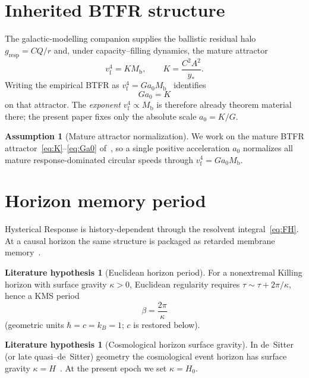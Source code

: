 \documentclass[11pt]{article}
\theoremstyle{definition}
\newtheorem{assumption}[theorem]{Assumption}
\newtheorem{literaturehypothesis}[theorem]{Literature hypothesis}
\theoremstyle{remark}
\newcommand{\Mb}{M_{\mathrm{b}}}
\newcommand{\vf}{v_{\mathrm{f}}}
\begin{document}
\section{Inherited BTFR structure}
\label{sec:btfr}
The galactic-modelling companion supplies the ballistic residual halo
$g_{\mathrm{resp}}=CQ/r$ and, under capacity--filling dynamics, the mature attractor~\cite{boyd2026galactic}
\begin{equation}
\label{eq:K}
\vf^{4}=K\Mb,\qquad K=\frac{C^{2}A^{2}}{y_{\ast}}.
\end{equation}
Writing the empirical BTFR as $\vf^{4}=Ga_0\Mb$~\cite{mcgaugh2012,lelli2016} identifies
\begin{equation}
\label{eq:Ga0}
Ga_0=K
\end{equation}
on that attractor.
The \emph{exponent} $\vf^{4}\propto\Mb$ is therefore already theorem material there;
the present paper fixes only the absolute scale $a_0=K/G$.

\begin{assumption}[Mature attractor normalization]
\label{ass:attractor}
We work on the mature BTFR attractor~\eqref{eq:K}--\eqref{eq:Ga0} of~\cite{boyd2026galactic},
so a single positive acceleration $a_0$ normalizes all mature response-dominated circular speeds
through $\vf^{4}=Ga_0\Mb$.
\end{assumption}

\section{Horizon memory period}
\label{sec:horizon}
Hysterical Response is history-dependent through the resolvent integral~\eqref{eq:FH}.
At a causal horizon the same structure is packaged as retarded membrane memory~\cite{boyd2026horizon}.

\begin{literaturehypothesis}[Euclidean horizon period]
\label{lit:period}
For a nonextremal Killing horizon with surface gravity $\kappa>0$, Euclidean regularity
requires $\tau\sim\tau+2\pi/\kappa$, hence a KMS period~\cite{Hawking1975,Unruh1976}
\begin{equation}
\label{eq:beta}
\beta=\frac{2\pi}{\kappa}
\end{equation}
(geometric units $\hbar=c=k_B=1$; $c$ is restored below).
\end{literaturehypothesis}

\begin{literaturehypothesis}[Cosmological horizon surface gravity]
\label{lit:cosmo-kappa}
In de~Sitter (or late quasi--de~Sitter) geometry the cosmological event horizon has
surface gravity $\kappa=H$~\cite{GibbonsHawking1977}.
At the present epoch we set $\kappa=H_0$.
\end{literaturehypothesis}
\end{document}
